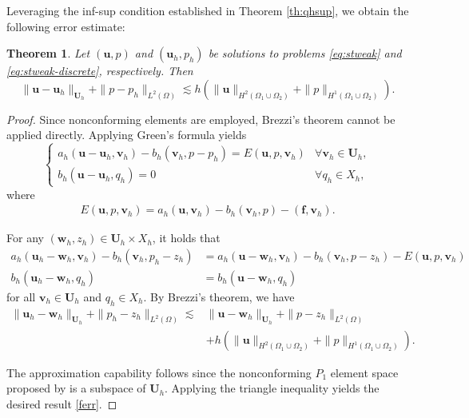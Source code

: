 \documentclass[a4paper,11pt,fleqn]{article}
\newtheorem{theorem}{Theorem}[section]
\numberwithin{equation}{section}
\begin{document}
Leveraging the inf-sup condition established in Theorem \ref{th:qhsup}, we obtain the following error estimate:
\begin{theorem}\label{th:err}
	Let $(\boldsymbol{u},p)$ and $(\boldsymbol{u}_h,p_h)$ be solutions to problems \eqref{eq:stweak} and \eqref{eq:stweak-discrete}, respectively. Then
	\begin{equation}\label{ferr}
		\|\boldsymbol{u}-\boldsymbol{u}_h\|_{\boldsymbol{U}_h} + \|p-p_h\|_{L^2(\Omega)} \lesssim h (\|\boldsymbol{u}\|_{H^2(\Omega_1\cup\Omega_2)} + \|p\|_{H^1(\Omega_1\cup\Omega_2)}).
	\end{equation}	
\end{theorem}
\begin{proof}
	Since nonconforming elements are employed, Brezzi's theorem cannot be applied directly. Applying Green's formula yields
	\begin{equation}\label{eq:err}
		\begin{cases}
			a_h(\boldsymbol{u}-\boldsymbol{u}_h, \boldsymbol{v}_h) - b_h(\boldsymbol{v}_h, p-p_h) = E(\bm{u},p,\boldsymbol{v}_h) & \forall \boldsymbol{v}_h \in \boldsymbol{U}_h, \\
			b_h(\boldsymbol{u}-\boldsymbol{u}_h, q_h) = 0 & \forall q_h \in X_h,
		\end{cases}
	\end{equation}
	where 
	\begin{align*}
		E(\bm{u},p,\boldsymbol{v}_h) = a_h(\boldsymbol{u}, \boldsymbol{v}_h) - b_h(\boldsymbol{v}_h, p) - (\boldsymbol{f},\boldsymbol{v}_h).
	\end{align*}
	
	For any $(\bm{w}_h,z_h)\in \bm{U}_h\times X_h$, it holds that
	\begin{align*}
		a_h(\boldsymbol{u}_h-\bm{w}_h, \boldsymbol{v}_h) - b_h(\boldsymbol{v}_h, p_h-z_h) &= a_h(\boldsymbol{u}-\bm{w}_h, \boldsymbol{v}_h) - b_h(\boldsymbol{v}_h, p-z_h) - E(\bm{u},p,\boldsymbol{v}_h) \\
		b_h(\boldsymbol{u}_h-\bm{w}_h, q_h) &= b_h(\boldsymbol{u}-\bm{w}_h, q_h)
	\end{align*}
	for all $\boldsymbol{v}_h \in \boldsymbol{U}_h$ and $q_h \in X_h$. By Brezzi's theorem, we have
	\begin{align*}
		\|\boldsymbol{u}_h-\bm{w}_h\|_{\bm{U}_h} + \|p_h-z_h\|_{L^2(\Omega)} \lesssim &\|\boldsymbol{u}-\bm{w}_h\|_{\bm{U}_h} + \|p-z_h\|_{L^2(\Omega)} \\
		                                                               &+ h (\|\bm{u}\|_{H^2(\Omega_1 \cup \Omega_2)} + \|p\|_{H^1(\Omega_1 \cup \Omega_2)}).
	\end{align*}
	
	The approximation capability follows since the nonconforming $P_1$ element space proposed by \cite{Wang2025nonconforming} is a subspace of $\bm{U}_h$. Applying the triangle inequality yields the desired result \eqref{ferr}.
\end{proof}
\end{document}

